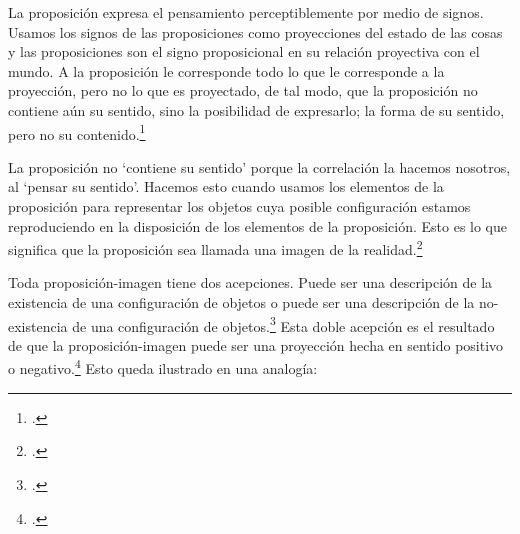         La proposición expresa el pensamiento perceptiblemente por medio de signos.
        Usamos los signos de las proposiciones como proyecciones del estado de las cosas
        y las proposiciones son el signo proposicional en su relación proyectiva con el
        mundo. A la proposición le corresponde todo lo que le corresponde a la
        proyección, pero no lo que es proyectado, de tal modo, que la proposición no
        contiene aún su sentido, sino la posibilidad de expresarlo; la forma de su
        sentido, pero no su contenido.\footcite[cf.~][3.1,3.11-3.13]{tractatus} 

        La proposición no `contiene su sentido' porque la correlación la hacemos nosotros,
        al `pensar su sentido'. Hacemos esto cuando usamos los elementos de la
        proposición para representar los objetos cuya posible configuración estamos 
        reproduciendo en la disposición de los elementos de la proposición. Esto es lo
        que significa que la proposición sea llamada una imagen de la
        realidad.\footcite[cf.~][p.69]{IWT}  

        Toda proposición-imagen tiene dos acepciones. Puede ser una descripción de
        la existencia de una configuración de objetos o puede ser una descripción de la
        no-existencia de una configuración de objetos.\footcite[cf.~][p.~72]{IWT} 
        Esta doble acepción es el resultado de que la proposición-imagen puede ser una
        proyección hecha en sentido positivo o negativo.\footcite[cf.~][p.~74]{IWT} Esto
        queda ilustrado en una analogía:


